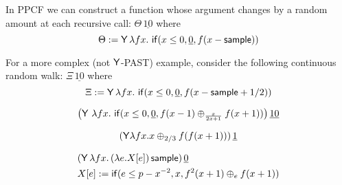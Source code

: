\iffalse
Sampling from continuous distributions is an essential feature of statistical probabilistic programming languages. (See e.g.~Church \cite{DBLP:conf/uai/GoodmanMRBT08}, Stan \cite{carpenter2017stan}, Anglican \cite{DBLP:conf/pkdd/TolpinMW15}, Gen \cite{cusumano-towner2019Gen}, Pyro \cite{bingham2019Pyro}, Edward \cite{tran2016edward} and Turing \cite{ge2018Turing}.)
Methods of proving AST of probabilistic computation have been developed for probabilistic programs with discrete distributions (see e.g.~\cite{DBLP:journals/toplas/LagoG19,DBLP:journals/jacm/KaminskiKMO18,DBLP:conf/lics/OlmedoKKM16,DBLP:conf/lics/KobayashiLG19,DBLP:conf/mfcs/KaminskiK15,DBLP:series/mcs/McIverM05}).
To our knowledge, the problem of proving AST of probabilistic functional programs with continuous distribution is new.
\fi

\begin{example}\label{ex:raven complex}
In PPCF we can construct a function whose argument changes by a random amount at each recursive call: $\Theta \, \underline{10}$ where
\[
\Theta := \mathsf{Y} \, \lambda f x .\ \mathsf{if}(x \leq 0, \underline 0, f(x - \mathsf{sample}))
\]

For a more complex (not $\mathsf{Y}$-PAST) example, consider the following continuous random walk: $\Xi \, \underline{10}$ where
\[
\Xi := \mathsf{Y} \, \lambda f x .\ \mathsf{if}(x \leq 0, \underline 0, f(x - \mathsf{sample} + 1/2)) 
\]
\end{example}

\begin{example}
\label{ex:Fair-in-the-limit random walk}\cite[\S 5.3]{DBLP:journals/pacmpl/McIverMKK18}
\[
\big
(\tY\ \lambda f x .\ 
\tif{x \leq 0}{\underline 0}{f(x - 1) \oplus_{\frac{x}{2x+1}} f(x + 1)} \big)
\, \underline{10}
\]
\end{example}

\begin{example}
\label{ex:non-affine recursion easy}
\[
(\mathsf{Y} \lambda f x. x \oplus_{2/3} f (f (x + 1)))\, \underline 1
\]
\end{example}

\begin{example}
\label{ex:non-affine continuous}
\begin{align*}
& (\mathsf{Y}\, \lambda f x.\, (\lambda e. X[e]) \, \mathsf{sample})\, \underline 0 \\
& X[e] := \mathsf{if}(e \leq p - x^{-2}, x, f^2(x+1) \oplus_e f(x+1))
\end{align*}
\end{example}

